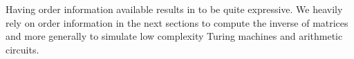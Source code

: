 Having order information available results in \langfor to be quite expressive. We heavily rely on order information in the next sections to compute the inverse of matrices and more generally to simulate low complexity Turing machines and arithmetic circuits.


%
